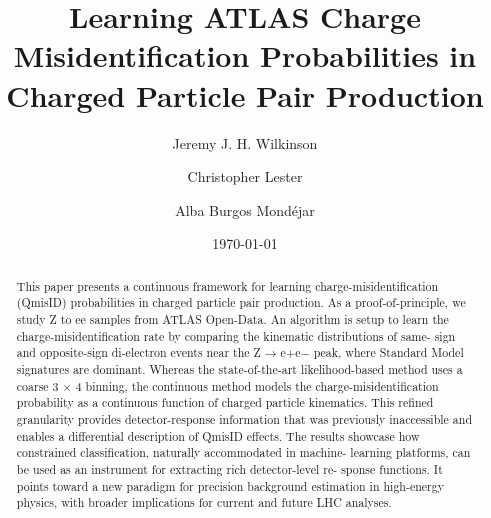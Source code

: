 \documentclass[11pt,a4paper]{article}
\title{Learning ATLAS Charge Misidentification Probabilities in Charged Particle Pair Production}
\author[1]{Jeremy J. H. Wilkinson}
\author[1]{Christopher Lester}
\author[1]{Alba Burgos Mondéjar}
\affil[1]{Cambridge University}
\date{\today}
\begin{document}
\maketitle

\begin{abstract}
This paper presents a continuous framework for learning charge-misidentification (QmisID)
probabilities in charged particle pair production. 
As a proof-of-principle, we study Z to ee samples from ATLAS Open-Data. An algorithm is setup to
learn the charge-misidentification rate by comparing the kinematic distributions of same-
sign and opposite-sign di-electron events near the Z → e+e− peak, where Standard
Model signatures are dominant. Whereas the state-of-the-art likelihood-based method
uses a coarse 3 × 4 binning, the continuous method models the charge-misidentification probability as
a continuous function of charged particle kinematics. This refined granularity provides
detector-response information that was previously inaccessible and enables a diﬀerential
description of QmisID eﬀects. 
The results showcase how constrained classification, naturally accommodated in machine-
learning platforms, can be used as an instrument for extracting rich detector-level re-
sponse functions. It points toward a new paradigm for precision background estimation
in high-energy physics, with broader implications for current and future LHC analyses.
\end{abstract}






\printbibliography
\end{document}
